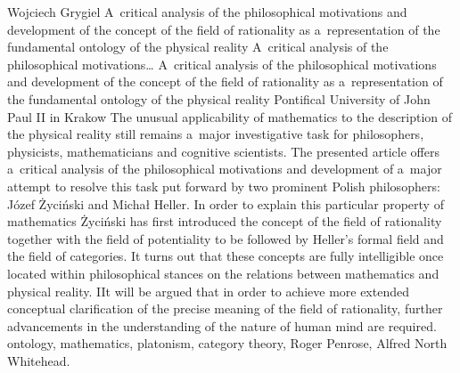 \begin{artengenv}{Wojciech Grygiel}
	{A~critical analysis of the philosophical motivations and development of the concept of the field of rationality as a~representation of the fundamental ontology of the physical reality}
	{A~critical analysis of the philosophical motivations\ldots}
	{A~critical analysis of the philosophical motivations and development of the concept of the field of rationality as a~representation of the fundamental ontology of the physical reality}
	{Pontifical University of John Paul II in Krakow}
	{The unusual applicability of mathematics to the description of the physical reality still remains a~major investigative task for philosophers, physicists, mathematicians and cognitive scientists. The presented article offers a~critical analysis of the philosophical motivations and development of a~major attempt to resolve this task put forward by two prominent Polish philosophers: Józef Życiński and Michał Heller. In order to explain this particular property of mathematics Życiński has first introduced the concept of the field of rationality together with the field of potentiality to be followed by Heller's formal field and the field of categories. It turns out that these concepts are fully intelligible once located within philosophical stances on the relations between mathematics and physical reality. IIt will be argued that in order to achieve more extended conceptual clarification of the precise meaning of the field of rationality, further advancements in the understanding of the nature of human mind are required.}
	{ontology, mathematics, platonism, category theory, Roger Penrose, Alfred North Whitehead.}




\end{artengenv}

